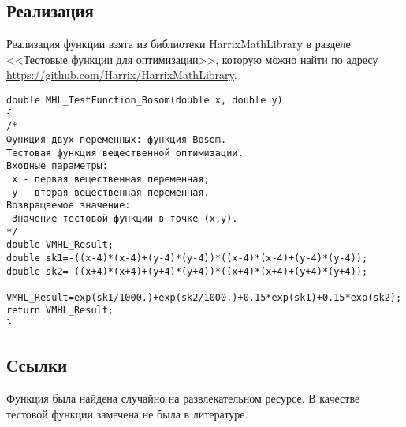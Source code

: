 \subsection {Реализация}

Реализация функции взята из библиотеки HarrixMathLibrary в разделе <<Тестовые функции для оптимизации>>, которую можно найти по адресу \href{https://github.com/Harrix/HarrixMathLibrary} {https://github.com/Harrix/HarrixMathLibrary}.

\begin{lstlisting}[caption=Код функции MHL\_TestFunction\_Bosom]
double MHL_TestFunction_Bosom(double x, double y)
{
/*
Функция двух переменных: функция Bosom.
Тестовая функция вещественной оптимизации.
Входные параметры:
 x - первая вещественная переменная;
 y - вторая вещественная переменная.
Возвращаемое значение:
 Значение тестовой функции в точке (x,y).
*/
double VMHL_Result;
double sk1=-((x-4)*(x-4)+(y-4)*(y-4))*((x-4)*(x-4)+(y-4)*(y-4));
double sk2=-((x+4)*(x+4)+(y+4)*(y+4))*((x+4)*(x+4)+(y+4)*(y+4));

VMHL_Result=exp(sk1/1000.)+exp(sk2/1000.)+0.15*exp(sk1)+0.15*exp(sk2);
return VMHL_Result;
}
\end{lstlisting}

\subsection {Ссылки}

Функция была найдена случайно на развлекательном ресурсе. В качестве тестовой функции замечена не была в литературе.